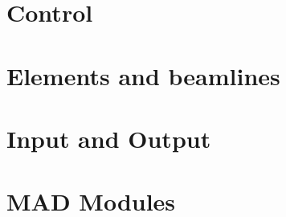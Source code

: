 \documentclass[11pt,a4paper,twoside]{report}
\begin{document}

\tableofcontents
\printindex

\part{Control}


\part{Elements and beamlines}           %

\part{Input and Output}                 %




\part{MAD Modules}                      %
%
%
\end{document}
